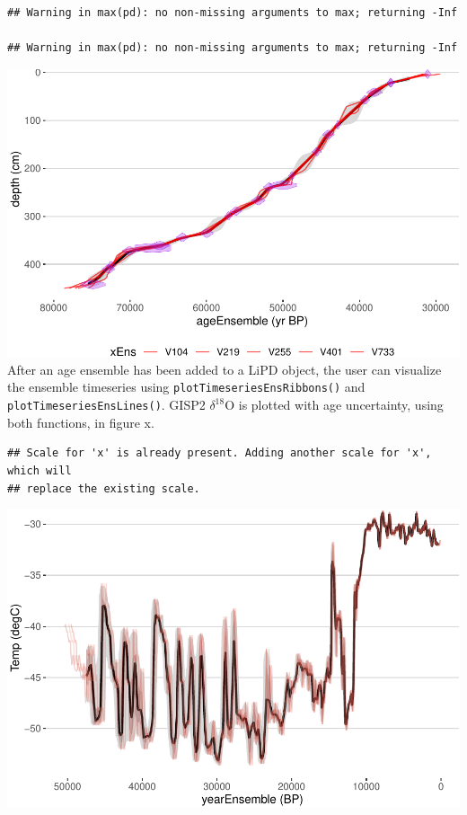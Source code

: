 \documentclass[gc, manuscript]{copernicus}
\begin{document}
\begin{verbatim}
## Warning in max(pd): no non-missing arguments to max; returning -Inf

## Warning in max(pd): no non-missing arguments to max; returning -Inf
\end{verbatim}

\includegraphics{geoChronR-paper_files/figure-latex/unnamed-chunk-3-1.pdf}
After an age ensemble has been added to a LiPD object, the user can
visualize the ensemble timeseries using
\texttt{plotTimeseriesEnsRibbons()} and
\texttt{plotTimeseriesEnsLines()}. GISP2 \(\delta^{18}\)O is plotted
with age uncertainty, using both functions, in figure x.

\begin{verbatim}
## Scale for 'x' is already present. Adding another scale for 'x', which will
## replace the existing scale.
\end{verbatim}

\includegraphics{geoChronR-paper_files/figure-latex/unnamed-chunk-5-1.pdf}
\end{document}
